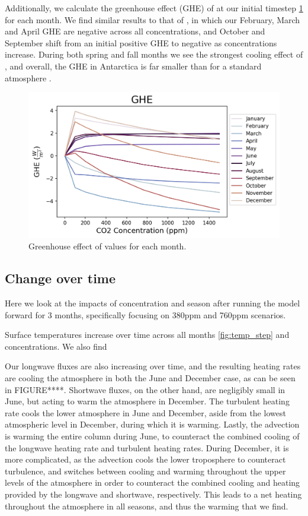 \documentclass[12]{article}
\begin{document}
Additionally, we calculate the greenhouse effect (GHE) of  at our initial timestep \ref{fig:GHE} for each month. We find similar results to that of \citep{schmithusen_how_2015}, in which our February, March and April GHE are negative across all  concentrations, and October and September shift from an initial positive GHE to negative as concentrations increase. During both spring and fall months we see the strongest cooling effect of , and overall, the GHE in Antarctica is far smaller than for a standard atmosphere \citep{schmithusen_how_2015}.

\begin{figure}[htb!]
\noindent\includegraphics[width=.8\textwidth]{figures/GHE.png}
\centering
\caption{Greenhouse effect of  values for each month.}
\label{fig:GHE}
\end{figure}

\subsection{Change over time}
Here we look at the impacts of  concentration and season after running the model forward for 3 months, specifically focusing on 380ppm and 760ppm scenarios. 

Surface temperatures increase over time across all months \ref{fig:temp_step} and  concentrations. We also find 



Our longwave fluxes are also increasing over time, and the resulting heating rates are cooling the atmosphere in both the June and December case, as can be seen in FIGURE****. Shortwave fluxes, on the other hand, are negligibly small in June, but acting to warm the atmosphere in December. The turbulent heating rate cools the lower atmosphere in June and December, aside from the lowest atmospheric level in December, during which it is warming. Lastly, the advection is warming the entire column during June, to counteract the combined cooling of the longwave heating rate and turbulent heating rates. During December, it is more complicated, as the advection cools the lower troposphere to counteract turbulence, and switches between cooling and warming throughout the upper levels of the atmosphere in order to counteract the combined cooling and heating provided by the longwave and shortwave, respectively. This leads to a net heating throughout the atmosphere in all seasons, and thus the warming that we find.
\end{document}
